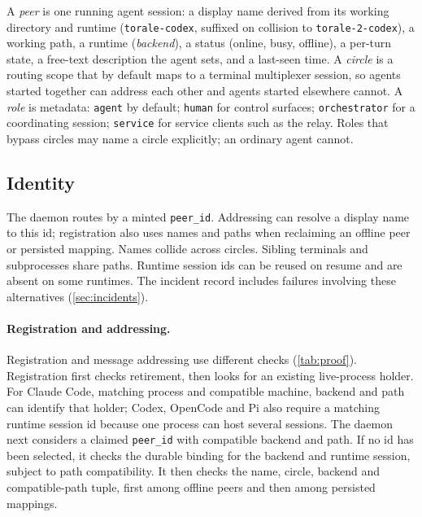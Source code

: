 \documentclass[10pt,twocolumn]{article}
\newcommand{\code}[1]{\texttt{#1}}
\begin{document}
A \emph{peer} is one running agent session: a display name derived from its working directory and runtime (\code{torale-codex}, suffixed on collision to \code{torale-2-codex}), a working path, a runtime (\emph{backend}), a status (online, busy, offline), a per-turn state, a free-text description the agent sets, and a last-seen time. A \emph{circle} is a routing scope that by default maps to a terminal multiplexer session, so agents started together can address each other and agents started elsewhere cannot. A \emph{role} is metadata: \code{agent} by default; \code{human} for control surfaces; \code{orchestrator} for a coordinating session; \code{service} for service clients such as the relay. Roles that bypass circles may name a circle explicitly; an ordinary agent cannot.

\subsection{Identity}
\label{sec:identity}

The daemon routes by a minted \code{peer\_id}. Addressing can resolve a display name to this id; registration also uses names and paths when reclaiming an offline peer or persisted mapping. Names collide across circles. Sibling terminals and subprocesses share paths. Runtime session ids can be reused on resume and are absent on some runtimes. The incident record includes failures involving these alternatives (\cref{sec:incidents}).

\paragraph{Registration and addressing.}
Registration and message addressing use different checks (\cref{tab:proof}). Registration first checks retirement, then looks for an existing live-process holder. For Claude Code, matching process and compatible machine, backend and path can identify that holder; Codex, OpenCode and Pi also require a matching runtime session id because one process can host several sessions. The daemon next considers a claimed \code{peer\_id} with compatible backend and path. If no id has been selected, it checks the durable binding for the backend and runtime session, subject to path compatibility. It then checks the name, circle, backend and compatible-path tuple, first among offline peers and then among persisted mappings.
\end{document}
